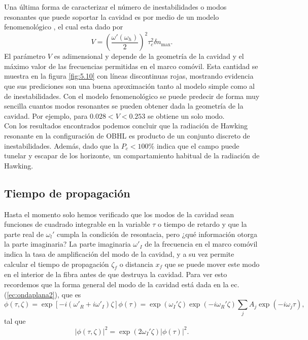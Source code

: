 Una \'ultima forma de caracterizar el n\'umero de inestabilidades o modos resonantes que puede soportar la cavidad es por medio de un modelo fenomenol\'ogico \citep{Agrawal2013}, el cual  esta dado por 
\begin{equation}\label{fenomeno}
V=\left(\frac{\omega'(\omega_h)}{2}\right)^2\tau_c^2\delta n_{\text{max}}.
\end{equation}
El par\'ametro $V$ es adimensional y depende de la geometr\'{i}a de la cavidad y el m\'{a}ximo valor de las frecuencias permitidas en el marco com\'ovil. Esta cantidad se muestra en la figura \ref{fig:5.10} con l\'ineas discontinuas rojas, mostrando evidencia que sus prediciones son una buena aproximaci\'{o}n tanto al modelo simple como al de inestabilidades. Con el modelo fenomenol\'ogico se puede predecir de forma muy sencilla cuantos modos resonantes se pueden obtener dada la geometr\'ia de la cavidad. Por ejemplo, para $0.028<V<0.253$ se obtiene un solo modo.\\

Con los resultados encontrados podemos concluir que la radiaci\'{o}n de Hawking resonante en la configuraci\'{o}n de OBHL es producto de un conjunto discreto de inestabilidades. Adem\'{a}s, dado que la $P_c<100\%$ indica que el campo puede tunelar y escapar de los horizonte, un compartamiento habitual de la radiaci\'{o}n de Hawking.

\subsection{Tiempo de propagaci\'{o}n}
Hasta el momento solo hemos verificado que los modos de la cavidad  sean funciones de cuadrado integrable en la variable $\tau$ o tiempo de retardo y que la parte real de $\omega_l'$ cumpla la condici\'{o}n de resontacia, pero ¿qu\'{e} informaci\'{o}n otorga la parte imaginaria? La parte imaginaria $\omega'_I$ de la frecuencia en el marco com\'{o}vil indica la tasa de amplificaci\'{o}n del modo de la cavidad, y a su vez permite calcular el tiempo de propagaci\'{o}n $\zeta_f$ o distancia $x_f$ que se puede mover este modo en el interior de la fibra antes de que destruya la cavidad. Para ver esto recordemos que la forma general del modo de la cavidad est\'{a} dada en la ec. (\ref{ec:ondaplana2}), que es
\begin{equation}
\phi(\tau,\zeta)=\exp[-i(\omega'_R+i\omega'_I)\zeta]\phi(\tau)=\exp(\omega_I'\zeta)\exp(-i\omega_R'\zeta)\sum_jA_j\exp(-i\omega_j\tau),
\end{equation}
tal que
\begin{equation}
 |\phi(\tau,\zeta)|^2=\exp(2\omega_{I}'\zeta)|\phi(\tau)|^2.
\end{equation}

